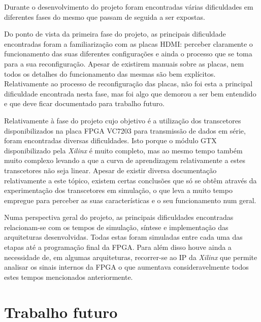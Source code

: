 Durante o desenvolvimento do projeto foram encontradas várias dificuldades em diferentes fases do mesmo que passam de seguida a ser expostas.

Do ponto de vista da primeira fase do projeto, as principais dificuldade encontradas foram a familiarização com as placas HDMI: perceber claramente o funcionamento das suas diferentes configurações e ainda o processo que se toma para a sua reconfiguração. Apesar de existirem manuais sobre as placas, nem todos os detalhes do funcionamento das mesmas são bem explícitos. Relativamente ao processo de reconfiguração das placas, não foi esta a principal dificuldade encontrada nesta fase, mas foi algo que demorou a ser bem entendido e que deve ficar documentado para trabalho futuro. 


Relativamente à fase do projeto cujo objetivo é a utilização dos transcetores disponibilizados na placa FPGA VC7203 para transmissão de dados em série, foram encontradas diversas dificuldades. Isto porque o módulo GTX disponibilizado pela \textit{Xilinx} é muito completo, mas ao mesmo tempo também muito complexo levando a que a curva de aprendizagem relativamente a estes transcetores não seja linear. Apesar de existir diversa documentação relativamente a este tópico, existem certas conclusões que só se obtêm através da experimentação dos transcetores em simulação, o que leva a muito tempo empregue para perceber as suas características e o seu funcionamento num geral.



Numa perspectiva geral do projeto, as principais dificuldades encontradas relacionam-se com os tempos de simulação, síntese e implementação das arquiteturas desenvolvidas. Todas estas foram simuladas entre cada uma das etapas até a programação final da FPGA. Para além disso houve ainda a necessidade de, em algumas arquiteturas, recorrer-se ao IP da \textit{Xilinx} que permite analisar os sinais internos da FPGA o que aumentava consideravelmente todos estes tempos mencionados anteriormente.



\section{Trabalho futuro}

